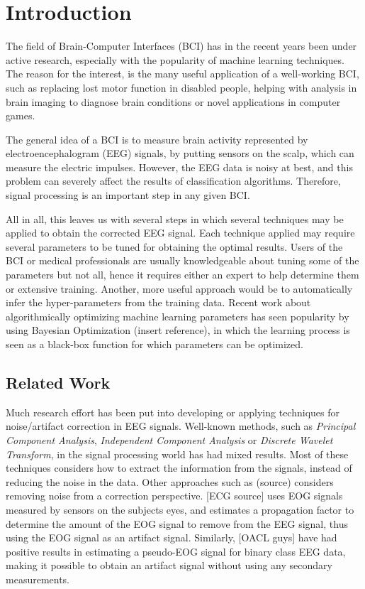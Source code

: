 \section{Introduction}
The field of Brain-Computer Interfaces (BCI) has in the recent years been under active research, especially with the popularity of machine learning techniques. The reason for the interest, is the many useful application of a well-working BCI, such as replacing lost motor function in disabled people, helping with analysis in brain imaging to diagnose brain conditions or novel applications in computer games. 

The general idea of a BCI is to measure brain activity represented by electroencephalogram (EEG) signals, by putting sensors on the scalp, which can measure the electric impulses. However, the EEG data is noisy at best, and this problem can severely affect the results of classification algorithms. Therefore, signal processing is an important step in any given BCI.

All in all, this leaves us with several steps in which several techniques may be applied to obtain the corrected EEG signal. Each technique applied may require several parameters to be tuned for obtaining the optimal results. Users of the BCI or medical professionals are usually knowledgeable about tuning some of the parameters but not all, hence it requires either an expert to help determine them or extensive training.
Another, more useful approach would be to automatically infer the hyper-parameters from the training data. Recent work about algorithmically optimizing machine learning parameters has seen popularity by using Bayesian Optimization (insert reference), in which the learning process is seen as a black-box function for which parameters can be optimized.

\subsection{Related Work}
Much research effort has been put into developing or applying techniques for noise/artifact correction in EEG signals. Well-known methods, such as \textit{Principal Component Analysis}, \textit{Independent Component Analysis} or \textit{Discrete Wavelet Transform}, in the signal processing world has had mixed results. Most of these techniques considers how to extract the information from the signals, instead of reducing the noise in the data.
Other approaches such as (source) considers removing noise from a correction perspective. [ECG source] uses EOG signals measured by sensors on the subjects eyes, and estimates a propagation factor to determine the amount of the EOG signal to remove from the EEG signal, thus using the EOG signal as an artifact signal. Similarly, [OACL guys] have had positive results in estimating a pseudo-EOG signal for binary class EEG data, making it possible to obtain an artifact signal without using any secondary measurements.
